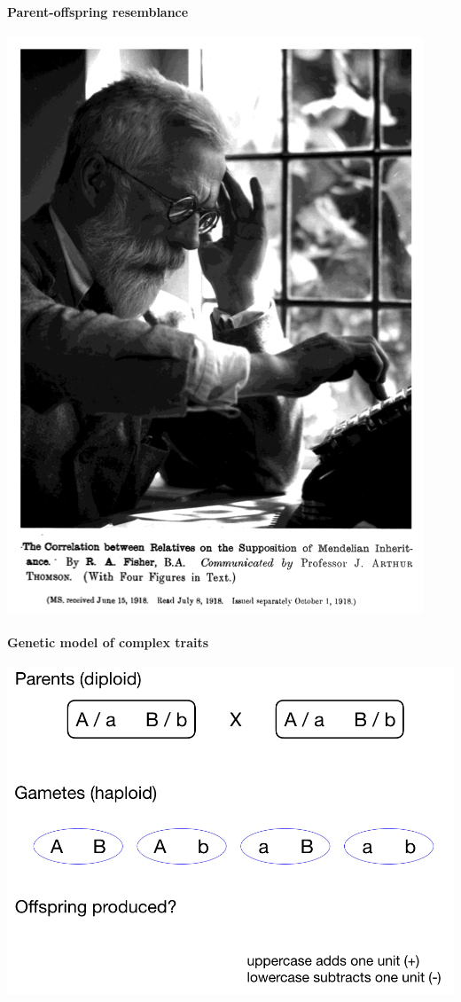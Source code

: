\documentclass[]{book}
\let\oldparagraph\paragraph
\renewcommand{\paragraph}[1]{\oldparagraph{#1}\mbox{}}
\begin{document}
\hypertarget{parent-offspring-resemblance}{%
\paragraph{Parent-offspring resemblance}\label{parent-offspring-resemblance}}

\begin{center}\includegraphics[width=0.45\linewidth]{images/week_2.016} \end{center}

\hypertarget{genetic-model-of-complex-traits}{%
\paragraph{Genetic model of complex traits}\label{genetic-model-of-complex-traits}}

\begin{center}\includegraphics[width=0.9\linewidth]{images/week_2.017} \end{center}
\end{document}
